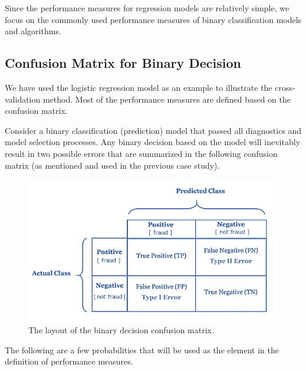 \documentclass[
]{book}
\begin{document}
Since the performance measures for regression models are relatively simple, we focus on the commonly used performance measures of binary classification models and algorithms.

\hypertarget{confusion-matrix-for-binary-decision}{%
\subsection{Confusion Matrix for Binary Decision}\label{confusion-matrix-for-binary-decision}}

We have used the logistic regression model as an example to illustrate the cross-validation method. Most of the performance measures are defined based on the confusion matrix.

Consider a binary classification (prediction) model that passed all diagnostics and model selection processes. Any binary decision based on the model will inevitably result in two possible errors that are summarized in the following confusion matrix (as mentioned and used in the previous case study).

\begin{figure}

{\centering \includegraphics[width=0.8\linewidth]{img06/w06-GeneralConfusionMatrix} 

}

\caption{The layout of the binary decision confusion matrix.}\label{fig:unnamed-chunk-127}
\end{figure}

The following are a few probabilities that will be used as the element in the definition of performance measures.
\end{document}
